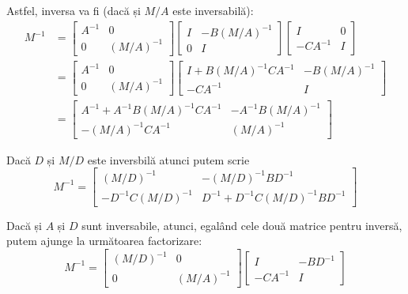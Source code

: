 \documentclass{exam}
\begin{document}
Astfel, inversa va fi (dacă și $M/A$ este inversabilă):
\begin{align*}
	M^{-1} & =
	\begin{bmatrix}
		A^{-1} & 0          \\
		0      & (M/A)^{-1}
	\end{bmatrix}
	\begin{bmatrix}
		I & -B (M/A)^{-1} \\
		0 & I
	\end{bmatrix}
	\begin{bmatrix}
		I         & 0 \\
		-C A^{-1} & I
	\end{bmatrix}                            \\
	       & = \begin{bmatrix}
		           A^{-1} & 0          \\
		           0      & (M/A)^{-1}
	           \end{bmatrix}
	\begin{bmatrix}
		I + B (M/A)^{-1} C A^{-1} & -B (M/A)^{-1} \\
		- C A^{-1}                & I
	\end{bmatrix} \\
	       & =
	\begin{bmatrix}
		A^{-1} + A^{-1} B (M/A)^{-1} C A^{-1} & -A^{-1} B (M/A)^{-1} \\
		- (M/A)^{-1} C A^{-1}                 & (M/A)^{-1}
	\end{bmatrix}
\end{align*}

Dacă $D$ și $M/D$ este inversbilă atunci putem scrie
\begin{equation*}
	M^{-1} = \begin{bmatrix} (M/D)^{-1} & -(M/D)^{-1} B D^{-1} \\ -D^{-1} C (M/D)^{-1} & D^{-1} + D^{-1} C (M/D)^{-1} B D^{-1} \end{bmatrix}
\end{equation*}

Dacă și $A$ și $D$ sunt inversabile, atunci, egalând cele două matrice pentru
inversă, putem ajunge la următoarea factorizare:
\begin{equation*}
	M^{-1} = \begin{bmatrix} (M/D)^{-1} & 0 \\ 0 & (M/A)^{-1} \end{bmatrix} \begin{bmatrix} I & -B D^{-1} \\ -C A^{-1} & I \end{bmatrix}
\end{equation*}
\end{document}
